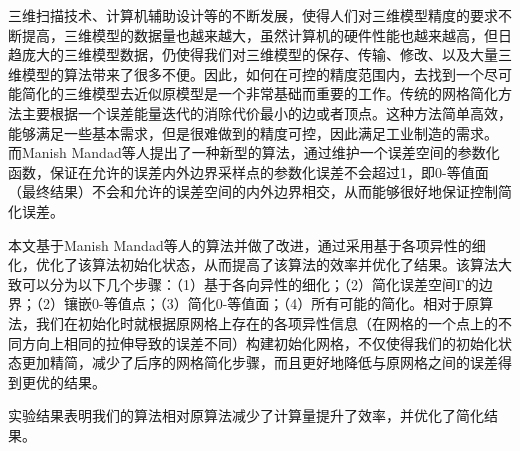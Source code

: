 
\begin{cabstract}
三维扫描技术、计算机辅助设计等的不断发展，使得人们对三维模型精度的要求不断提高，三维模型的数据量也越来越大，虽然计算机的硬件性能也越来越高，但日趋庞大的三维模型数据，仍使得我们对三维模型的保存、传输、修改、以及大量三维模型的算法带来了很多不便。因此，如何在可控的精度范围内，去找到一个尽可能简化的三维模型去近似原模型是一个非常基础而重要的工作。传统的网格简化方法主要根据一个误差能量迭代的消除代价最小的边或者顶点。这种方法简单高效，能够满足一些基本需求，但是很难做到的精度可控，因此满足工业制造的需求。 而Manish Mandad等人提出了一种新型的算法\cite{isotopic-appro}，通过维护一个误差空间的参数化函数，保证在允许的误差内外边界采样点的参数化误差不会超过1，即0-等值面（最终结果）不会和允许的误差空间的内外边界相交，从而能够很好地保证控制简化误差。\par
本文基于Manish Mandad等人的算法\cite{isotopic-appro}并做了改进，通过采用基于各项异性的细化，优化了该算法初始化状态，从而提高了该算法的效率并优化了结果。该算法大致可以分为以下几个步骤：（1）基于各向异性的细化；（2）简化误差空间Γ的边界；（2）镶嵌0-等值点；（3）简化0-等值面；（4）所有可能的简化。相对于原算法，我们在初始化时就根据原网格上存在的各项异性信息（在网格的一个点上的不同方向上相同的拉伸导致的误差不同）构建初始化网格，不仅使得我们的初始化状态更加精简，减少了后序的网格简化步骤，而且更好地降低与原网格之间的误差得到更优的结果。\par
实验结果表明我们的算法相对原算法减少了计算量提升了效率，并优化了简化结果。
\end{cabstract}

